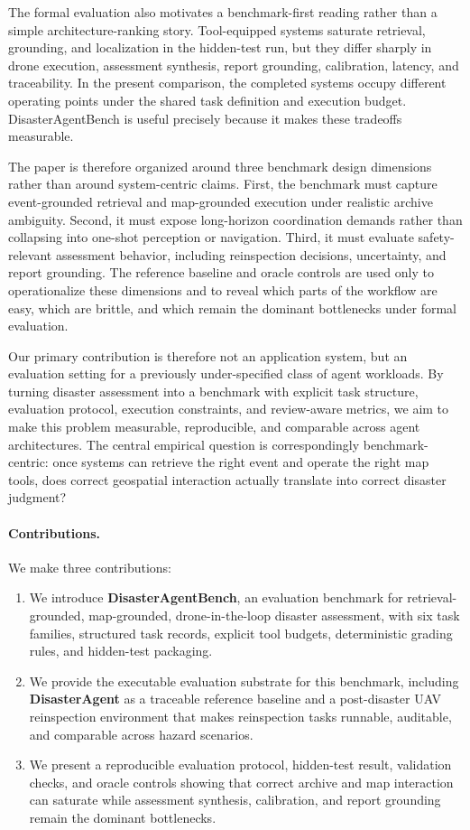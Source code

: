 \documentclass{article}
\begin{document}
The formal evaluation also motivates a benchmark-first reading rather than a simple architecture-ranking story. Tool-equipped systems saturate retrieval, grounding, and localization in the hidden-test run, but they differ sharply in drone execution, assessment synthesis, report grounding, calibration, latency, and traceability. In the present comparison, the completed systems occupy different operating points under the shared task definition and execution budget. DisasterAgentBench is useful precisely because it makes these tradeoffs measurable.

The paper is therefore organized around three benchmark design dimensions rather than around system-centric claims. First, the benchmark must capture event-grounded retrieval and map-grounded execution under realistic archive ambiguity. Second, it must expose long-horizon coordination demands rather than collapsing into one-shot perception or navigation. Third, it must evaluate safety-relevant assessment behavior, including reinspection decisions, uncertainty, and report grounding. The reference baseline and oracle controls are used only to operationalize these dimensions and to reveal which parts of the workflow are easy, which are brittle, and which remain the dominant bottlenecks under formal evaluation.

Our primary contribution is therefore not an application system, but an evaluation setting for a previously under-specified class of agent workloads. By turning disaster assessment into a benchmark with explicit task structure, evaluation protocol, execution constraints, and review-aware metrics, we aim to make this problem measurable, reproducible, and comparable across agent architectures. The central empirical question is correspondingly benchmark-centric: once systems can retrieve the right event and operate the right map tools, does correct geospatial interaction actually translate into correct disaster judgment?

\paragraph{Contributions.}
We make three contributions:
\begin{enumerate}[leftmargin=1.2em]
    \item We introduce \textbf{DisasterAgentBench}, an evaluation benchmark for retrieval-grounded, map-grounded, drone-in-the-loop disaster assessment, with six task families, structured task records, explicit tool budgets, deterministic grading rules, and hidden-test packaging.
    \item We provide the executable evaluation substrate for this benchmark, including \textbf{DisasterAgent} as a traceable reference baseline and a post-disaster UAV reinspection environment that makes reinspection tasks runnable, auditable, and comparable across hazard scenarios.
    \item We present a reproducible evaluation protocol, hidden-test result, validation checks, and oracle controls showing that correct archive and map interaction can saturate while assessment synthesis, calibration, and report grounding remain the dominant bottlenecks.
\end{enumerate}
\end{document}
